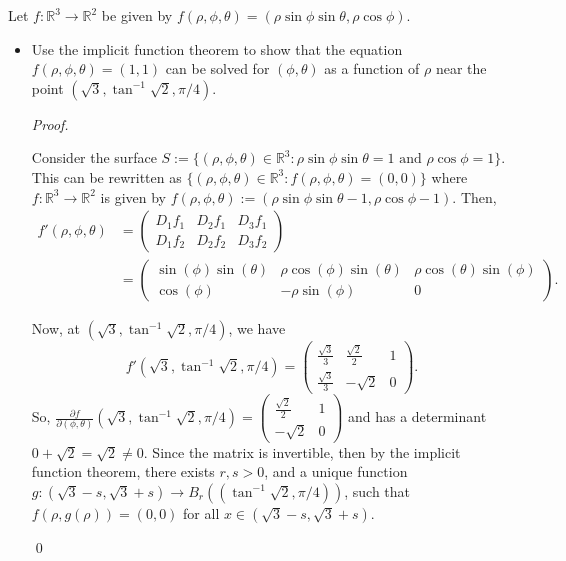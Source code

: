 \documentclass[12pt]{article}
\newenvironment{problem}[2][Problem]{\begin{trivlist}
\item[\hskip \labelsep {\bfseries #1}\hskip \labelsep {\bfseries
#2.}]}{\end{trivlist}}
\newenvironment{sol}
    {\emph{Proof.}
    }
    {
    \qed
    }
\begin{document}
\begin{problem}{23}
Let $f : \mathbb{R}^3 \to \mathbb{R}^2$ be given by $f(\rho, \phi, \theta) = (\rho\sin\phi\sin\theta,\rho\cos\phi)$.

\begin{itemize}
    \item[(a)] Use the implicit function theorem to show that the equation $f(\rho,\phi,\theta) = (1,1)$ can be solved for $(\phi,\theta)$ as a function of $\rho$ near the point $(\sqrt{3},\tan^{-1}\sqrt{2}, \pi/4)$.
    
    \begin{sol}
    Consider the surface $S := \{(\rho, \phi, \theta) \in \mathbb{R}^3 : \rho\sin\phi\sin\theta = 1 \text{ and } \rho\cos\phi = 1\}$. This can be rewritten as $\{(\rho, \phi, \theta) \in \mathbb{R}^3 : f(\rho, \phi, \theta) = (0,0)\}$ where $f : \mathbb{R}^3 \to \mathbb{R}^2$ is given by $f(\rho, \phi, \theta) := (\rho\sin\phi\sin\theta - 1,\rho\cos\phi - 1)$.
    Then, \begin{align*}
        f'(\rho, \phi, \theta) &= \begin{pmatrix}
D_1f_1 & D_2f_1 & D_3f_1 \\ 
D_1f_2 & D_2f_2 & D_3f_2
\end{pmatrix} \\ &= \begin{pmatrix}
\sin\left(\phi\right) \sin\left(\theta\right) & \rho \cos\left(\phi\right) \sin\left(\theta\right) & \rho \cos\left(\theta\right) \sin\left(\phi\right) \\ 
\cos\left(\phi\right) & -\rho \sin\left(\phi\right) & 0
\end{pmatrix}.
    \end{align*}
    
    Now, at $(\sqrt{3},\tan^{-1}\sqrt{2}, \pi/4)$, we have $$f'(\sqrt{3},\tan^{-1}\sqrt{2}, \pi/4) = \begin{pmatrix}
\frac{\sqrt{3}}{3} & \frac{\sqrt{2}}{2} & 1 \\ 
\frac{\sqrt{3}}{3} & -\sqrt{2} & 0
\end{pmatrix}.$$ So, $\frac{\partial f}{\partial (\phi, \theta)}(\sqrt{3},\tan^{-1}\sqrt{2}, \pi/4) = \begin{pmatrix}
\frac{\sqrt{2}}{2} & 1 \\ 
-\sqrt{2} & 0
\end{pmatrix}$ and has a determinant $0+\sqrt{2} = \sqrt{2} \neq 0$. Since the matrix is invertible, then by the implicit function theorem, there exists $r,s > 0$, and a unique function $g : (\sqrt{3}-s,\sqrt{3}+s) \to B_r\left((\tan^{-1}\sqrt{2},\pi/4)\right)$, such that $f(\rho,g(\rho)) = (0,0)$ for all $x \in (\sqrt{3}-s,\sqrt{3}+s)$.
    \end{sol}
    

\end{itemize}
\end{problem}
\end{document}
